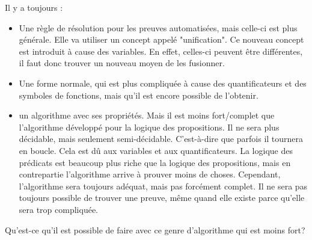 Il y a toujours :

\begin{itemize}

  \item Une règle de résolution pour les preuves automatisées, mais celle-ci est plus générale. Elle va utiliser un concept appelé "unification". Ce nouveau concept est introduit à cause des variables. En effet, celles-ci peuvent être différentes, il faut donc trouver un nouveau moyen de les fusionner.
  \item Une forme normale, qui  est plus compliquée à cause des quantificateurs et des symboles de fonctions, mais qu'il est encore possible de l'obtenir.
  \item un algorithme avec ses propriétés. Mais il est moins fort/complet que l'algorithme développé pour la logique des propositions. Il ne sera plus décidable, mais seulement semi-décidable. C'est-à-dire que parfois il tournera en boucle. Cela est dû aux variables et aux quantificateurs. La logique des prédicats est beaucoup plus riche que la logique des propositions, mais en contrepartie l'algorithme arrive à prouver moins de choses. Cependant, l'algorithme sera toujours adéquat, mais pas forcément complet. Il ne sera pas toujours possible de trouver une preuve, même quand elle existe parce qu'elle sera trop compliquée.

\end{itemize}


Qu'est-ce qu'il est possible de faire avec ce genre d'algorithme qui est moins fort?


